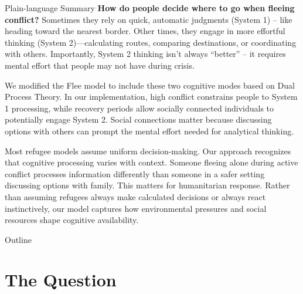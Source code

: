 \documentclass[aspectratio=169]{beamer}
\begin{document}
\begin{frame}{Plain-language Summary}
\small
\textbf{How do people decide where to go when fleeing conflict?} Sometimes they rely on quick, automatic judgments (System 1) – like heading toward the nearest border. Other times, they engage in more effortful thinking (System 2)—calculating routes, comparing destinations, or coordinating with others. Importantly, System 2 thinking isn't always ``better'' – it requires mental effort that people may not have during crisis.

\vspace{0.5em}

We modified the Flee model to include these two cognitive modes based on Dual Process Theory. In our implementation, high conflict constrains people to System 1 processing, while recovery periods allow socially connected individuals to potentially engage System 2. Social connections matter because discussing options with others can prompt the mental effort needed for analytical thinking.

\vspace{0.5em}

Most refugee models assume uniform decision-making. Our approach recognizes that cognitive processing varies with context. Someone fleeing alone during active conflict processes information differently than someone in a safer setting discussing options with family. This matters for humanitarian response. Rather than assuming refugees always make calculated decisions or always react instinctively, our model captures how environmental pressures and social resources shape cognitive availability.
\end{frame}

\begin{frame}{Outline}
\tableofcontents
\end{frame}

\section{The Question}
\end{document}
